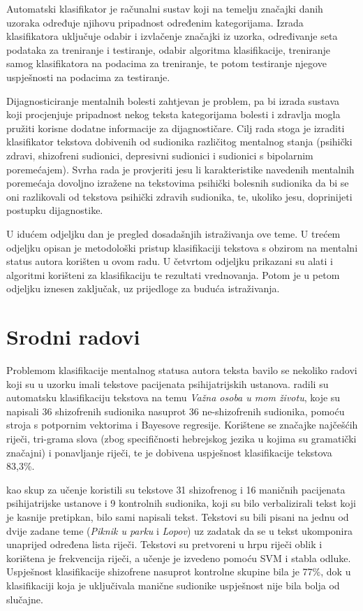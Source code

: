 \documentclass[10pt, a4paper]{article}
\begin{document}
Automatski klasifikator je računalni sustav koji na temelju značajki danih uzoraka određuje njihovu pripadnost određenim kategorijama. Izrada klasifikatora uključuje odabir i izvlačenje značajki iz uzorka, određivanje seta podataka za treniranje i testiranje, odabir algoritma klasifikacije, treniranje samog klasifikatora na podacima za treniranje, te potom testiranje njegove uspješnosti na podacima za testiranje. 

Dijagnosticiranje mentalnih bolesti zahtjevan je problem, pa bi izrada sustava koji procjenjuje pripadnost nekog teksta kategorijama bolesti i zdravlja mogla pružiti korisne dodatne informacije za dijagnostičare. Cilj rada stoga je izraditi klasifikator tekstova dobivenih od sudionika različitog mentalnog stanja (psihički zdravi, shizofreni sudionici, depresivni sudionici i sudionici s bipolarnim poremećajem). Svrha rada je provjeriti jesu li karakteristike navedenih mentalnih poremećaja dovoljno izražene na tekstovima psihički bolesnih sudionika da bi se oni razlikovali od tekstova psihički zdravih sudionika, te, ukoliko jesu, doprinijeti postupku dijagnostike.

U idućem odjeljku dan je pregled dosadašnjih istraživanja ove teme. U trećem odjeljku opisan je metodološki pristup klasifikaciji tekstova s obzirom na mentalni status autora korišten u ovom radu. U četvrtom odjeljku prikazani su alati i algoritmi korišteni za klasifikaciju te rezultati vrednovanja. Potom je u petom odjeljku iznesen zaključak, uz prijedloge za buduća istraživanja.

\section{Srodni radovi}
Problemom klasifikacije mentalnog statusa autora teksta bavilo se nekoliko radovi koji su u uzorku imali tekstove pacijenata psihijatrijskih ustanova. \citet{strous-2009} radili su automatsku klasifikaciju tekstova na temu \emph{Važna osoba u mom životu}, koje su napisali 36 shizofrenih sudionika nasuprot 36 ne-shizofrenih sudionika, pomoću stroja s potpornim vektorima  i Bayesove regresije. Korištene se značajke najčešćih riječi, tri-grama slova (zbog specifičnosti hebrejskog jezika u kojima su gramatički značajni) i ponavljanje riječi, te je dobivena uspješnost klasifikacije tekstova 83,3\%.

\citet{exray} kao skup za učenje koristili su tekstove 31 shizofrenog i 16 maničnih pacijenata psihijatrijske ustanove i 9 kontrolnih sudionika, koji su bilo verbalizirali tekst koji je kasnije pretipkan, bilo sami napisali tekst. Tekstovi su bili pisani na jednu od dvije zadane teme (\emph{Piknik u parku} i \emph{Lopov}) uz zadatak da se u tekst ukomponira unaprijed određena lista riječi. Tekstovi su pretvoreni u hrpu riječi  oblik i korištena je frekvencija riječi, a učenje je izvedeno pomoću SVM i stabla odluke. Uspješnost klasifikacije shizofrene nasuprot kontrolne skupine bila je 77\%, dok u klasifikaciji koja je uključivala manične sudionike uspješnost nije bila bolja od slučajne. 
\end{document}
